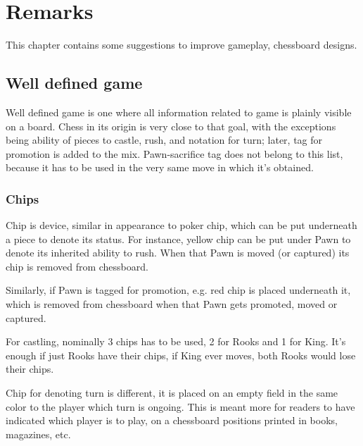 

\chapter*{Remarks}
\label{ch:Remarks}

This chapter contains some suggestions to improve gameplay, chessboard
designs.

\section*{Well defined game}
\label{sec:Remarks/Well defined game}

Well defined game is one where all information related to game is plainly
visible on a board. Chess in its origin is very close to that goal, with
the exceptions being ability of pieces to castle, rush, and notation for
turn; later, tag for promotion is added to the mix. Pawn-sacrifice tag
does not belong to this list, because it has to be used in the very same
move in which it's obtained.

\subsection*{Chips}
\label{sec:Remarks/Chips}

Chip is device, similar in appearance to poker chip, which can be put
underneath a piece to denote its status. For instance, yellow chip can be
put under Pawn to denote its inherited ability to rush. When that Pawn is
moved (or captured) its chip is removed from chessboard.

Similarly, if Pawn is tagged for promotion, e.g. red chip is placed
underneath it, which is removed from chessboard when that Pawn gets promoted,
moved or captured.

For castling, nominally 3 chips has to be used, 2 for Rooks and 1 for King.
It's enough if just Rooks have their chips, if King ever moves, both Rooks
would lose their chips.

Chip for denoting turn is different, it is placed on an empty field in the
same color to the player which turn is ongoing. This is meant more for
readers to have indicated which player is to play, on a chessboard positions
printed in books, magazines, etc.

